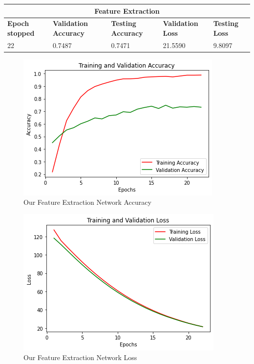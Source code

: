 \medskip

\begin{tabular}{ |p{2cm}|p{2cm}|p{2cm}|p{2cm}|p{2cm}|  }
\hline
\multicolumn{5}{|c|}{Feature Extraction} \\
\hline
\textbf{Epoch stopped} & \textbf{Validation Accuracy} & \textbf{Testing Accuracy} & \textbf{Validation Loss} & \textbf{Testing Loss} \\
\hline
22& 0.7487 & 0.7471 & 21.5590 & 9.8097\\
\hline
\end{tabular}

\medskip

\begin{figure}[H]
	\centering
	\includegraphics[height=0.45\textwidth]{img/vgg16/vgg16ft1dropregacc.png}
	\caption{Our Feature Extraction Network Accuracy}
	\label{fig:vgg16ft1dropregacc}
\end{figure}

\begin{figure}[H]
	\centering
	\includegraphics[height=0.45\textwidth]{img/vgg16/vgg16ft1dropregloss.png}
	\caption{Our Feature Extraction Network Loss}
	\label{fig:vgg16ft1dropregloss}
\end{figure}









